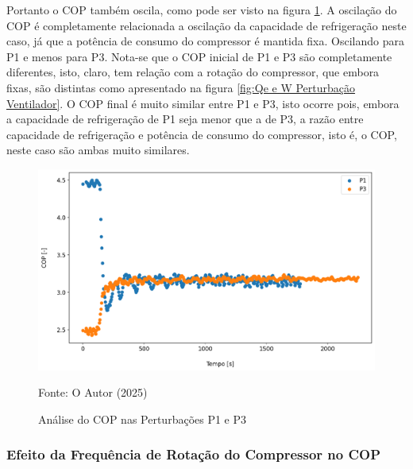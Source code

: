 Portanto o COP também oscila, como pode ser visto na figura \ref{fig:COP Perturbação Ventilador}. A oscilação do COP é completamente relacionada a oscilação da capacidade de refrigeração neste caso, já que a potência de consumo do compressor é mantida fixa. Oscilando para P1 e menos para P3. Nota-se que o COP inicial de P1 e P3 são completamente diferentes, isto, claro, tem relação com a rotação do compressor, que embora fixas, são distintas como apresentado na figura \ref{fig:Qe e W Perturbação Ventilador}. O COP final é muito similar entre P1 e P3, isto ocorre pois, embora a capacidade de refrigeração de P1 seja menor que a de P3, a razão entre capacidade de refrigeração e potência de consumo do compressor, isto é, o COP, neste caso são ambas muito similares. 
\newpage
\begin{figure}[h]
    \centering
    \includegraphics[width=1\linewidth]{FigurasdoTexto/COP Perturbação Ventilador.png}
    \caption{Análise do COP nas Perturbações P1 e P3}
    \label{fig:COP Perturbação Ventilador}
    {\footnotesize Fonte: O Autor (2025)}
\end{figure}

\subsubsection{Efeito da Frequência de Rotação do Compressor no COP}


